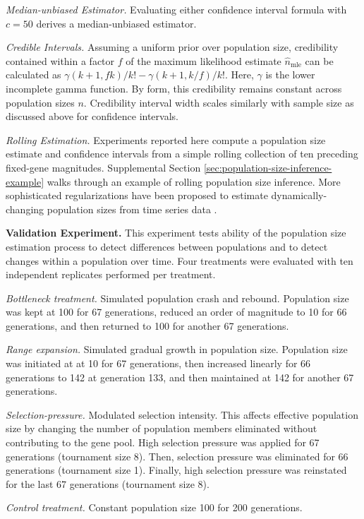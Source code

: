 \textit{Median-unbiased Estimator.}
Evaluating either confidence interval formula with $c = 50$ derives a median-unbiased estimator.

\textit{Credible Intervals.}
Assuming a uniform prior over population size, credibility contained within a factor $f$ of the maximum likelihood estimate $\hat{n}_\mathrm{mle}$ can be calculated as $\gamma(k + 1, f k)/k! - \gamma(k + 1, k/f)/k!$.
Here, $\gamma$ is the lower incomplete gamma function.
By form, this credibility remains constant across population sizes $n$.
Credibility interval width scales similarly with sample size as discussed above for confidence intervals.

\textit{Rolling Estimation.}
Experiments reported here compute a population size estimate and confidence intervals from a simple rolling collection of ten preceding fixed-gene magnitudes.
Supplemental Section \ref{sec:population-size-inference-example} walks through an example of rolling population size inference.
More sophisticated regularizations have been proposed to estimate dynamically-changing population sizes from time series data \citep{hakan2012distributed}.

\textbf{Validation Experiment.}
This experiment tests ability of the population size estimation process to detect differences between populations and to detect changes within a population over time.
Four treatments were evaluated with ten independent replicates performed per treatment.

\textit{Bottleneck treatment.}
Simulated population crash and rebound.
Population size was kept at 100 for 67 generations, reduced an order of magnitude to 10 for 66 generations, and then returned to 100 for another 67 generations.

\textit{Range expansion.}
Simulated gradual growth in population size.
Population size was initiated at at 10 for 67 generations, then increased linearly for 66 generations to 142 at generation 133, and then maintained at 142 for another 67 generations.

\textit{Selection-pressure.}
Modulated selection intensity.
This affects effective population size by changing the number of population members eliminated without contributing to the gene pool.
High selection pressure was applied for 67 generations (tournament size 8). Then, selection pressure was eliminated for 66 generations (tournament size 1).
Finally, high selection pressure was reinstated for the last 67 generations (tournament size 8).

\textit{Control treatment.} Constant population size 100 for 200 generations.
